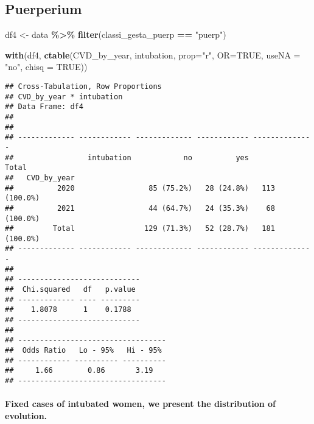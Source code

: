\documentclass[
]{article}
\newenvironment{Shaded}{\begin{snugshade}}{\end{snugshade}}
\newcommand{\AttributeTok}[1]{\textcolor[rgb]{0.13,0.29,0.53}{#1}}
\newcommand{\ConstantTok}[1]{\textcolor[rgb]{0.56,0.35,0.01}{#1}}
\newcommand{\FunctionTok}[1]{\textcolor[rgb]{0.13,0.29,0.53}{\textbf{#1}}}
\newcommand{\NormalTok}[1]{#1}
\newcommand{\OtherTok}[1]{\textcolor[rgb]{0.56,0.35,0.01}{#1}}
\newcommand{\SpecialCharTok}[1]{\textcolor[rgb]{0.81,0.36,0.00}{\textbf{#1}}}
\newcommand{\StringTok}[1]{\textcolor[rgb]{0.31,0.60,0.02}{#1}}
\begin{document}
\hypertarget{puerperium-7}{%
\subsection{Puerperium}\label{puerperium-7}}

\begin{Shaded}
\begin{Highlighting}[]
\NormalTok{df4 }\OtherTok{\textless{}{-}}\NormalTok{ data }\SpecialCharTok{\%\textgreater{}\%} 
  \FunctionTok{filter}\NormalTok{(classi\_gesta\_puerp }\SpecialCharTok{==} \StringTok{"puerp"}\NormalTok{)}

\FunctionTok{with}\NormalTok{(df4, }\FunctionTok{ctable}\NormalTok{(CVD\_by\_year, intubation, }\AttributeTok{prop=}\StringTok{"r"}\NormalTok{, }\AttributeTok{OR=}\ConstantTok{TRUE}\NormalTok{, }\AttributeTok{useNA =} \StringTok{"no"}\NormalTok{, }\AttributeTok{chisq =} \ConstantTok{TRUE}\NormalTok{))}
\end{Highlighting}
\end{Shaded}

\begin{verbatim}
## Cross-Tabulation, Row Proportions  
## CVD_by_year * intubation  
## Data Frame: df4  
## 
## 
## ------------- ------------ ------------- ------------ --------------
##                 intubation            no          yes          Total
##   CVD_by_year                                                       
##          2020                 85 (75.2%)   28 (24.8%)   113 (100.0%)
##          2021                 44 (64.7%)   24 (35.3%)    68 (100.0%)
##         Total                129 (71.3%)   52 (28.7%)   181 (100.0%)
## ------------- ------------ ------------- ------------ --------------
## 
## ----------------------------
##  Chi.squared   df   p.value 
## ------------- ---- ---------
##    1.8078      1    0.1788  
## ----------------------------
## 
## ----------------------------------
##  Odds Ratio   Lo - 95%   Hi - 95% 
## ------------ ---------- ----------
##     1.66        0.86       3.19   
## ----------------------------------
\end{verbatim}

\hypertarget{fixed-cases-of-intubated-women-we-present-the-distribution-of-evolution.}{%
\paragraph{Fixed cases of intubated women, we present the distribution
of
evolution.}\label{fixed-cases-of-intubated-women-we-present-the-distribution-of-evolution.}}
\end{document}
